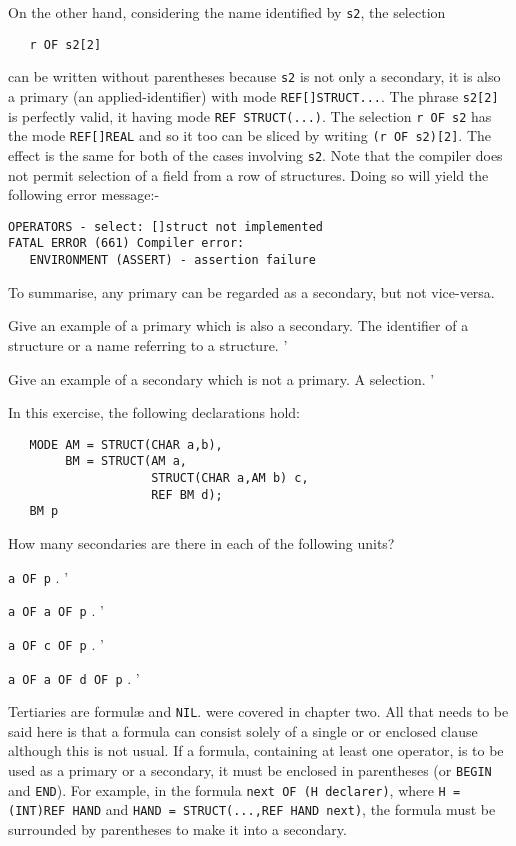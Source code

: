 On the other hand, considering the name identified by \verb|s2|, the
selection
\begin{verbatim}
   r OF s2[2]
\end{verbatim}
\noindent
can be written without parentheses because \verb|s2| is not only a
secondary, it is also a primary (an applied-identifier) with mode
\verb|REF[]STRUCT...|. The phrase \verb|s2[2]| is perfectly valid, it
having mode \verb|REF STRUCT(...)|.  The selection \verb|r OF s2| has
the mode \verb|REF[]REAL| and so it too can be sliced by writing
\verb|(r OF s2)[2]|. The effect is the same for both of the cases
involving \verb|s2|. Note that the 
compiler does not permit selection of a field from a row of
structures. Doing so will yield the following error message:-
\begin{verbatim}
OPERATORS - select: []struct not implemented
FATAL ERROR (661) Compiler error:
   ENVIRONMENT (ASSERT) - assertion failure
\end{verbatim}

To summarise, any primary can be regarded as a secondary, but not
vice-versa.

\begin{exercise}
\item Give an example of a primary which is also a secondary.
\ans The identifier of a structure or a name referring to a structure.
'
\item Give an example of a secondary which is not a primary. \ans A
selection.
'
\item In this exercise, the following declarations hold:
\begin{verbatim}
   MODE AM = STRUCT(CHAR a,b),
        BM = STRUCT(AM a,
                    STRUCT(CHAR a,AM b) c,
                    REF BM d);
   BM p
\end{verbatim}
\noindent
How many secondaries are there in each of the following units?
\begin{subex}
\item \verb|a OF p| .
'
\item \verb|a OF a OF p| .
'
\item \verb|a OF c OF p| .
'
\item \verb|a OF a OF d OF p| .
'
\end{subex}
\end{exercise}

Tertiaries are formul\ae{} and \verb|NIL|.  
were covered in chapter two.  All that needs to be said here is that a
formula can consist solely of a single  or 
or enclosed clause although this is not usual.  If a formula,
containing at least one operator, is to be used as a primary or a
secondary, it must be enclosed in parentheses (or \verb|BEGIN| and
\verb|END|).  For example, in the formula
\verb|next OF (H declarer)|, where \verb|H = (INT)REF HAND| and
\verb|HAND = STRUCT(...,REF HAND next)|, the formula must be
surrounded by parentheses to make it into a secondary.

